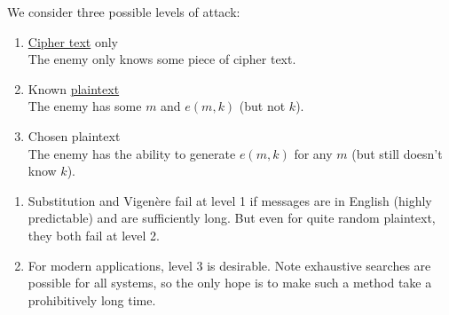 \documentclass{article}
\newcommand{\1}[1]{\mathbbm{1}_{#1}}
\begin{document}
We consider three possible levels of attack:
\begin{enumerate}[label=\textbf{Level \arabic*},leftmargin=2cm]
    \item \hyperlink{def:text}{Cipher text} only\\
        The enemy only knows some piece of cipher text.
    \item Known \hyperlink{def:text}{plaintext}\\
        The enemy has some $m$ and $e(m, k)$ (but not $k$).
    \item Chosen plaintext\\
        The enemy has the ability to generate $e(m, k)$ for any $m$ (but still doesn't know $k$).
\end{enumerate}
\begin{remark}\leavevmode
    \begin{enumerate} [label=(\arabic*)]
        \item Substitution and Vigen\`{e}re fail at level 1 if messages are in English (highly predictable) and are sufficiently long. But even for quite random plaintext, they both fail at level 2.
        \item For modern applications, level 3 is desirable. Note exhaustive searches are possible for all systems, so the only hope is to make such a method take a prohibitively long time.
    \end{enumerate}
\end{remark}
\end{document}
